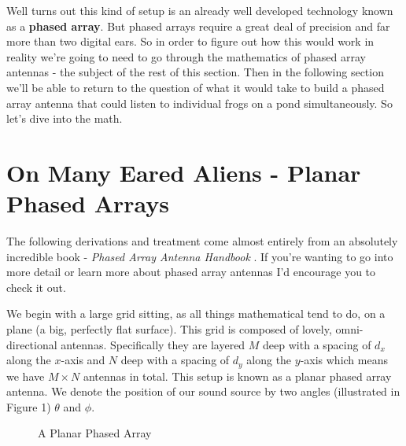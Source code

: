 \documentclass[10pt,a5paper]{book}
\begin{document}
Well turns out this kind of setup is an already well developed technology known as a \textbf{phased array}. But phased arrays require a great deal of precision and far more than two digital ears. So in order to figure out how this would work in reality we're going to need to go through the mathematics of phased array antennas - the subject of the rest of this section. Then in the following section we'll be able to return to the question of what it would take to build a phased array antenna that could listen to individual frogs on a pond simultaneously. So let's dive into the math. 

\section{On Many Eared Aliens - Planar Phased Arrays}
The following derivations and treatment come almost entirely from an absolutely incredible book - \textit{Phased Array Antenna Handbook} \cite{phasedhandbook}. If you're wanting to go into more detail or learn more about phased array antennas I'd encourage you to check it out. 

We begin with a large grid sitting, as all things mathematical tend to do, on a plane (a big, perfectly flat surface). This grid is composed of lovely, omni-directional antennas. Specifically they are layered $M$ deep with a spacing of $d_x$ along the $x$-axis  and $N$ deep with a spacing of $d_y$ along the $y$-axis which means we have $M\times N$ antennas in total. This setup is known as a planar phased array antenna. We denote the position of our sound source by two angles (illustrated in Figure 1) $\theta$ and $\phi$. 

\begin{figure}[!htb]
\caption{\label{fig:my-label} A Planar Phased Array}
\end{figure}
\end{document}

